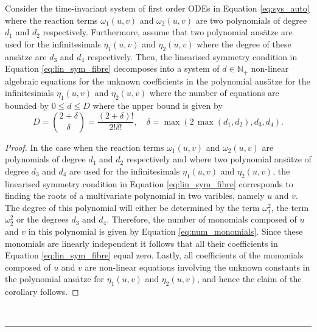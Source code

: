\begin{corollary}
  Consider the time-invariant system of first order ODEs in Equation \eqref{eq:sys_auto} where the reaction terms $\omega_1(u,v)$ and $\omega_2(u,v)$ are two polynomials of degree $d_1$ and $d_2$ respectively. Furthermore, assume that two polynomial ans\"atze are used for the infinitesimals $\eta_1(u,v)$ and $\eta_2(u,v)$ where the degree of these ans\"atze are $d_3$ and $d_4$ respectively. Then, the linearised symmetry condition in Equation \eqref{eq:lin_sym_fibre} decomposes into a system of $d\in\mathbb{N}_+$ non-linear algebraic equations for the unknown coefficients in the polynomial ans\"atze for the infinitesimals $\eta_1(u,v)$ and $\eta_2(u,v)$ where the number of equations are bounded by $0\leq d\leq D$ where the upper bound is given by
  \begin{equation}
    D={2+\delta\choose \delta}=\dfrac{(2+\delta)!}{2!\delta!},\quad\delta=\max\left(2\,\max\left(d_1,d_2\right),d_3,d_4\right).
    \label{eq:num_monomials}
    \end{equation}

\label{thm:lin_sym_cond_fibre_phase_plane_polynomial}
\end{corollary}
\dotfill
\begin{proof}
  \noindent In the case when the reaction terms $\omega_1(u,v)$ and $\omega_2(u,v)$ are polynomials of degree $d_1$ and $d_2$ respectively and where two polynomial ans\"atze of degree $d_3$ and $d_4$ are used for the infinitesimals $\eta_1(u,v)$ and $\eta_2(u,v)$, the linearised symmetry condition in Equation \eqref{eq:lin_sym_fibre} corresponds to finding the roots of a multivariate polynomial in two varibles, namely $u$ and $v$. The degree of this polynomial will either be determined by the term $\omega_1^2$, the term $\omega_2^2$ or the degrees $d_3$ and $d_4$. Therefore, the number of monomials composed of $u$ and $v$ in this polynomial is given by Equation \eqref{eq:num_monomials}. Since these monomials are linearly independent it follows that all their coefficients in Equation \eqref{eq:lin_sym_fibre} equal zero. Lastly, all coefficients of the monomials composed of $u$ and $v$ are non-linear equations involving the unknown constants in the polynomial ans\"atze for $\eta_1(u,v)$ and $\eta_2(u,v)$, and hence the claim of the corollary follows.
\end{proof}
\dotfill\\
\hrule

